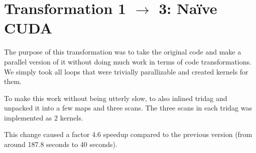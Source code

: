 \section{Transformation 1 $\rightarrow$ 3: Naïve CUDA}

The purpose of this transformation was to take the original code and
make a parallel version of it without doing much work in terms of code
transformations. We simply took all loops that were trivially
parallizable and created kernels for them.

To make this work without being utterly slow, to also inlined tridag
and unpacked it into a few maps and three scans. The three scans in
each tridag was implemented as 2 kernels.

This change caused a factor 4.6 speedup compared to the previous version
(from around 187.8 seconds to 40 seconds).
